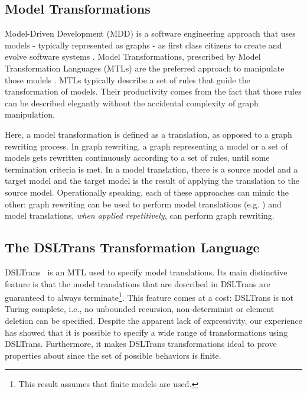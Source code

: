 \subsection{Model Transformations}

Model-Driven Development (MDD) is a software engineering approach that uses
models - typically represented as graphs - as first class citizens to create and evolve software systems
\cite{Hailpern:2006vd}.
Model Transformations, prescribed by Model Transformation Languages (MTLs) are the preferred approach to manipulate those models \cite{Software2003}.
MTLs typically describe a set of rules that guide the transformation of models.
Their productivity comes from the fact that those rules can be described
elegantly without the accidental complexity of graph manipulation.

Here, a model transformation is defined as
a translation, as opposed to a graph rewriting process.
In graph rewriting, a graph representing a model or a set of models gets rewritten continuously according to a set
of rules, until some termination criteria is met.
In a model translation, there is a source model and a target model and the
target model is the result of applying the translation to the source model.
Operationally speaking, each of these approaches can mimic the other: graph
rewriting can be used to perform model translations (e.g. \cite{Grunske2005})
and model translations, \emph{when applied repetitively}, can perform graph
rewriting.

\subsection{The DSLTrans Transformation Language}

DSLTrans~\cite{Barroca2011} is an MTL used to specify model translations.
Its main distinctive feature is that the model translations that are described
in DSLTrans are guaranteed to always terminate\footnote{This result assumes that finite models are
used.}. This feature comes at a cost: DSLTrans is not Turing complete, i.e., no
unbounded recursion, non-determinist or
element deletion can be specified.
Despite the apparent lack of expressivity, our experience has showed that it is
possible to specify a wide range of transformations using DSLTrans. Furthermore,
it makes DSLTrans transformations ideal to prove properties about since the set
of possible behaviors is finite.

